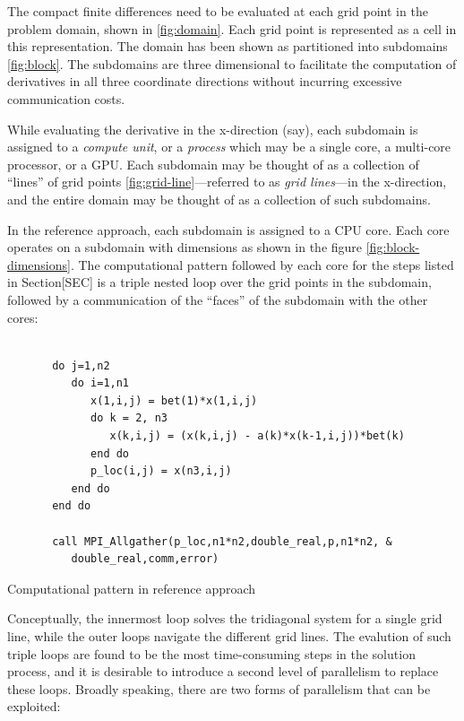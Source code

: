 \documentclass{article}
\begin{document}
    \pagebreak

    The compact finite differences need to be evaluated
    at each grid point in the problem domain,
    shown in \ref{fig:domain}.
    Each grid point is represented as a cell in this representation.
    The domain has been shown as partitioned into subdomains \ref{fig:block}.
    The subdomains are three dimensional to facilitate
    the computation of derivatives in all three coordinate directions
    without incurring excessive communication costs.

    While evaluating the derivative in the x-direction (say),
    each subdomain is assigned to a \emph{compute unit}, or a \emph{process}
    which may be a single core, a multi-core processor, or a GPU.
    Each subdomain may be thought of as a collection of ``lines'' of grid points
    \ref{fig:grid-line}---referred to as \emph{grid lines}---in the x-direction,
    and the entire domain may be thought of as a collection of such subdomains.

    In the reference approach, each subdomain is assigned to a CPU core.
    Each core operates on a subdomain with dimensions as shown
    in the figure \ref{fig:block-dimensions}.
    The computational pattern followed by each core for the steps listed in Section[SEC]
    is a triple nested loop over the grid points in the subdomain,
    followed by a communication of the ``faces'' of the subdomain with the other
    cores:

    \begin{listing}
    \begin{verbatim}

       do j=1,n2
          do i=1,n1
             x(1,i,j) = bet(1)*x(1,i,j)
             do k = 2, n3
                x(k,i,j) = (x(k,i,j) - a(k)*x(k-1,i,j))*bet(k)
             end do
             p_loc(i,j) = x(n3,i,j)
          end do
       end do

       call MPI_Allgather(p_loc,n1*n2,double_real,p,n1*n2, &
          double_real,comm,error)

    \end{verbatim}
    \caption{Computational pattern in reference approach}
    \label{listing:triple-loop}
    \end{listing}

    Conceptually, the innermost loop solves the tridiagonal system
    for a single grid line,
    while the outer loops navigate the different grid lines.
    The evalution of such triple loops are found to be the most time-consuming steps
    in the solution process,
    and it is desirable to introduce a second level of parallelism to replace these loops.
    Broadly speaking, there are two forms of parallelism that can be exploited:
\end{document}
